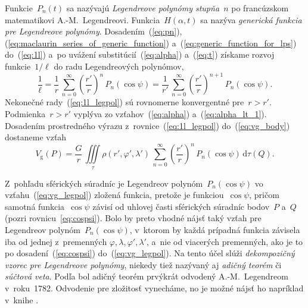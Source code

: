 \documentclass[a4paper, 12pt]{book}
\newcommand{\diff}{\mathrm d}
\newcommand{\gidx}{\mathrm g}
\begin{document}
Funkcie~$P_n(t)$ sa nazývajú \emph{Legendreove polynómy stupňa~$n$} po 
francúzskom matematikovi A.-M.~Legendreovi.  Funkcia~$H(\alpha, t)$ sa nazýva 
\emph{generická funkcia pre Legendreove polynómy}.  Dosadením~(\ref{eq:pn}), 
(\ref{eq:maclaurin_series_of_generic_function}) 
a~(\ref{eq:generic_function_for_lps}) do~(\ref{eq:1l}) a~po uvážení 
substitúcií~(\ref{eq:alpha}) a~(\ref{eq:t}) získame rozvoj funkcie~$1 \slash 
\ell$ do radu Legendreových polynómov,
%
\begin{equation}
\label{eq:1l_legpol}
\frac{1}{\ell} = \frac{1}{r} \, \sum_{n = 0}^\infty \left( \frac{r'}{r} 
\right)^{n} \, P_n(\cos\psi) = \frac{1}{r'} \, \sum_{n = 0}^\infty \left( 
\frac{r'}{r} \right)^{n + 1} \, P_n(\cos\psi){.}
\end{equation}
%
Nekonečné rady~(\ref{eq:1l_legpol}) sú rovnomerne konvergentné pre~$r > r'$.  
Podmienka~$r > r'$ vyplýva zo vzťahov~(\ref{eq:alpha}) a~(\ref{eq:alpha_lt_1}).  
Dosadením prostredného výrazu z~rovnice~(\ref{eq:1l_legpol}) 
do~(\ref{eq:vg_body}) dostaneme vzťah
%
\begin{equation}
\label{eq:vg_legpol}
V_\gidx(P) = \frac{G}{r} \, \iiint\limits_{\tau} \rho(r', \varphi', \lambda') 
\, \sum_{n = 0}^{\infty} \left( \frac{r'}{r} \right)^n \, P_n(\cos\psi) \, 
\diff\tau(Q){.}
\end{equation}

Z~pohľadu sférických súradníc je Legendreov polynóm~$P_n(\cos\psi)$ vo 
vzťahu~(\ref{eq:vg_legpol}) zložená funkcia, pretože je funkciou~$\cos\psi$, 
pričom samotná funkcia~$\cos\psi$ závisí od uhlovej časti sférických súradníc 
bodov~$P$ a~$Q$ (pozri rovnicu~\ref{eq:cospsi}).  Bolo by preto vhodné nájsť 
taký vzťah pre Legendreov polynóm~$P_n(\cos\psi)$,
v~ktorom by každá prípadná funkcia závisela iba od jednej z~premenných
$\varphi,  \lambda, \varphi', \lambda'$, a~nie od viacerých
premenných, ako je to po dosadení~(\ref{eq:cospsi})
do~(\ref{eq:vg_legpol}).  Na tento účel slúži \emph{dekompozičný vzorec pre
Legendreove polynómy}, niekedy tiež nazývaný aj \emph{adičný teorém} či 
\emph{súčtová veta}.  Podľa \textcite{Hobson} bol adičný teorém prvýkrát 
odvodený A.-M.~Legendreom v~roku~1782.  Odvodenie pre zložitosť vynecháme, no 
je možné nájsť ho napríklad v~knihe \textcite{Hobson}.
\end{document}
